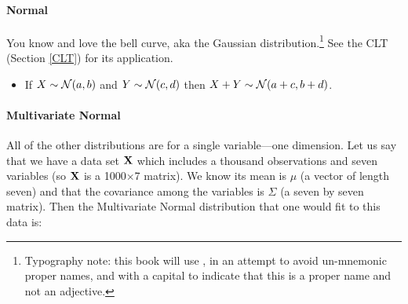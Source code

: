 \paragraph{Normal}

You know and love the bell curve, aka the Gaussian
distribution.\footnote{Typography note: this book will use ,
in an attempt to avoid un-mnemonic proper names, and with a capital to indicate
that this is a proper name and not an adjective.} See the CLT (Section
\ref{CLT}) for its application.


 

\begin{itemize}
\item If $X \sim {\cal N} (a,b)$ and $Y \sim {\cal N} (c,d)$ then $X+Y \sim {\cal N}
(a+c,b+d)$.
\end{itemize}

\paragraph{Multivariate Normal}
All of the other distributions are for a single variable---one
dimension. Let us say that we have a data set ${\bf X}$ which includes a
thousand observations and seven variables (so ${\bf X}$ is a 1000$\times$7
matrix). We know its mean is
$\mu$ (a vector of length seven) and that the covariance among the
variables is $\Sigma$ (a seven by seven matrix). Then the Multivariate
Normal distribution that one would fit to this data is:

